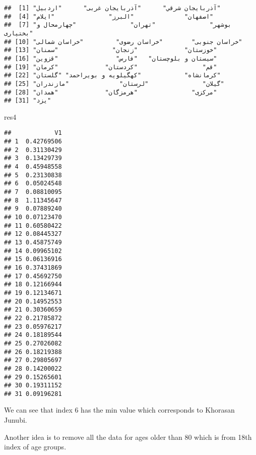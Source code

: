 \documentclass[
]{article}
\newenvironment{Shaded}{\begin{snugshade}}{\end{snugshade}}
\newcommand{\NormalTok}[1]{#1}
\begin{document}
\begin{verbatim}
##  [1] "آذربايجان شرقي"      "آذربايجان غربی"      "اردبیل"             
##  [4] "اصفهان"              "البرز"               "ایلام"              
##  [7] "بوشهر"               "تهران"               "چهارمحال و بختیاری" 
## [10] "خراسان جنوبی"        "خراسان رضوی"         "خراسان شمالی"       
## [13] "خوزستان"             "زنجان"               "سمنان"              
## [16] "سیستان و بلوچستان"   "فارس"                "قزوین"              
## [19] "قم"                  "کردستان"             "کرمان"              
## [22] "کرمانشاه"            "کهگیلویه و بویراحمد" "گلستان"             
## [25] "گیلان"               "لرستان"              "مازندران"           
## [28] "مرکزی"               "هرمزگان"             "همدان"              
## [31] "یزد"
\end{verbatim}

\begin{Shaded}
\begin{Highlighting}[]
\NormalTok{res4}
\end{Highlighting}
\end{Shaded}

\begin{verbatim}
##            V1
## 1  0.42769506
## 2  0.31130429
## 3  0.13429739
## 4  0.45948558
## 5  0.23130838
## 6  0.05024548
## 7  0.08810095
## 8  1.11345647
## 9  0.07889240
## 10 0.07123470
## 11 0.60580422
## 12 0.08445327
## 13 0.45875749
## 14 0.09965102
## 15 0.06136916
## 16 0.37431869
## 17 0.45692750
## 18 0.12166944
## 19 0.12134671
## 20 0.14952553
## 21 0.30360659
## 22 0.21785872
## 23 0.05976217
## 24 0.18189544
## 25 0.27026082
## 26 0.18219388
## 27 0.29805697
## 28 0.14200022
## 29 0.15265601
## 30 0.19311152
## 31 0.09196281
\end{verbatim}

We can see that index 6 has the min value which corresponds to Khorasan
Junubi.

Another idea is to remove all the data for ages older than 80 which is
from 18th index of age groups.
\end{document}
